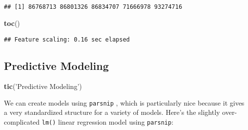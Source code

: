 \documentclass[
]{book}
\newenvironment{Shaded}{\begin{snugshade}}{\end{snugshade}}
\newcommand{\DecValTok}[1]{\textcolor[rgb]{0.00,0.00,0.81}{#1}}
\newcommand{\KeywordTok}[1]{\textcolor[rgb]{0.13,0.29,0.53}{\textbf{#1}}}
\newcommand{\NormalTok}[1]{#1}
\newcommand{\OperatorTok}[1]{\textcolor[rgb]{0.81,0.36,0.00}{\textbf{#1}}}
\newcommand{\StringTok}[1]{\textcolor[rgb]{0.31,0.60,0.02}{#1}}
\begin{document}
\begin{Shaded}
\end{Shaded}

\begin{verbatim}
## [1] 86768713 86801326 86834707 71666978 93274716
\end{verbatim}

\begin{Shaded}
\begin{Highlighting}[]
\KeywordTok{toc}\NormalTok{()}
\end{Highlighting}
\end{Shaded}

\begin{verbatim}
## Feature scaling: 0.16 sec elapsed
\end{verbatim}

\hypertarget{predictive-modeling}{%
\subsection{Predictive Modeling}\label{predictive-modeling}}

\begin{Shaded}
\begin{Highlighting}[]
\KeywordTok{tic}\NormalTok{(}\StringTok{'Predictive Modeling'}\NormalTok{)}
\end{Highlighting}
\end{Shaded}

We can create models using \texttt{parsnip} \citep{R-parsnip}, which is particularly nice because it gives a very standardized structure for a variety of models. Here's the slightly over-complicated \texttt{lm()} linear regression model using \texttt{parsnip}:

\begin{Shaded}
\end{Shaded}
\end{document}

